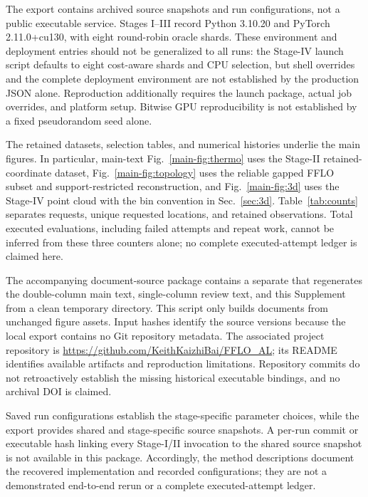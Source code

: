 The export contains archived source snapshots and run configurations, not a public executable service. Stages I--III record Python 3.10.20 and PyTorch 2.11.0+cu130, with eight round-robin oracle shards. These environment and deployment entries should not be generalized to all runs: the Stage-IV launch script defaults to eight cost-aware shards and CPU selection, but shell overrides and the complete deployment environment are not established by the production JSON alone. Reproduction additionally requires the launch package, actual job overrides, and platform setup. Bitwise GPU reproducibility is not established by a fixed pseudorandom seed alone.

The retained datasets, selection tables, and numerical histories underlie the main figures. In particular, main-text Fig.~\ref{main-fig:thermo} uses the Stage-II retained-coordinate dataset, Fig.~\ref{main-fig:topology} uses the reliable gapped FFLO subset and support-restricted reconstruction, and Fig.~\ref{main-fig:3d} uses the Stage-IV point cloud with the bin convention in Sec.~\ref{sec:3d}. Table~\ref{tab:counts} separates requests, unique requested locations, and retained observations. Total executed evaluations, including failed attempts and repeat work, cannot be inferred from these three counters alone; no complete executed-attempt ledger is claimed here.

The accompanying document-source package contains a separate  that regenerates the double-column main text, single-column review text, and this Supplement from a clean temporary directory. This script only builds documents from unchanged figure assets. Input hashes identify the source versions because the local export contains no Git repository metadata. The associated project repository is \url{https://github.com/KeithKaizhiBai/FFLO_AL}; its README identifies available artifacts and reproduction limitations. Repository commits do not retroactively establish the missing historical executable bindings, and no archival DOI is claimed.

Saved run configurations establish the stage-specific parameter choices, while the export provides shared and stage-specific source snapshots. A per-run commit or executable hash linking every Stage-I/II invocation to the shared source snapshot is not available in this package. Accordingly, the method descriptions document the recovered implementation and recorded configurations; they are not a demonstrated end-to-end rerun or a complete executed-attempt ledger.
